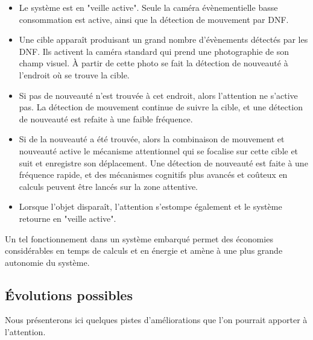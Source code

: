 	\begin{itemize}
		\item Le système est en "veille active". Seule la caméra évènementielle basse consommation est active, ainsi que la détection de mouvement par DNF.
		\item Une cible apparaît produisant un grand nombre d'évènements détectés par les DNF. Ils activent la caméra standard qui prend une photographie de son champ visuel. À partir de cette photo se fait la détection de nouveauté à l'endroit où se trouve la cible.
		\item Si pas de nouveauté n'est trouvée à cet endroit, alors l'attention ne s'active pas. La détection de mouvement continue de suivre la cible, et une détection de nouveauté est refaite à une faible fréquence.
		\item Si de la nouveauté a été trouvée, alors la combinaison de mouvement et nouveauté active le mécanisme attentionnel qui se focalise sur cette cible et suit et enregistre son déplacement. Une détection de nouveauté est faite à une fréquence rapide, et des mécanismes cognitifs plus avancés et coûteux en calculs peuvent être lancés sur la zone attentive.
		\item Lorsque l'objet disparaît, l'attention s'estompe également et le système retourne en "veille active".
	\end{itemize}

	Un tel fonctionnement dans un système embarqué permet des économies considérables en temps de calculs et en énergie et amène à une plus grande autonomie du système.

	\subsection{Évolutions possibles}

	Nous présenterons ici quelques pistes d'améliorations que l'on pourrait apporter à l'attention.

